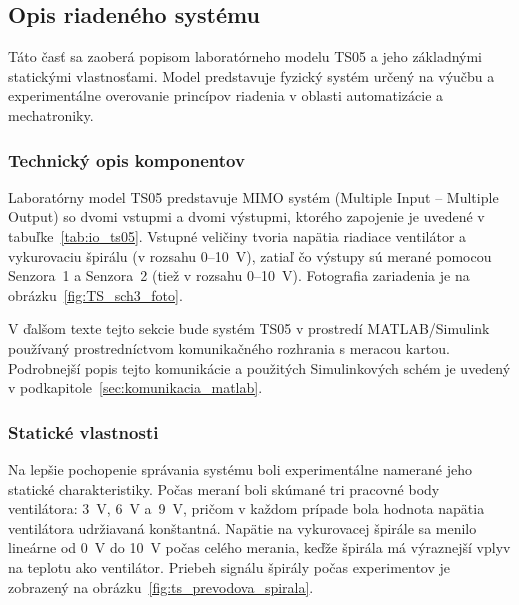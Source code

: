 \subsection{Opis riadeného systému}

Táto časť sa zaoberá popisom laboratórneho modelu TS05 a jeho základnými statickými vlastnosťami.  
Model predstavuje fyzický systém určený na výučbu a experimentálne overovanie princípov riadenia v oblasti automatizácie a mechatroniky.


\subsubsection{Technický opis komponentov}

Laboratórny model TS05 predstavuje MIMO systém (Multiple Input – Multiple Output) so dvomi vstupmi a dvomi výstupmi, ktorého zapojenie je uvedené v tabuľke~\ref{tab:io_ts05}.  
Vstupné veličiny tvoria napätia riadiace ventilátor a vykurovaciu špirálu (v rozsahu 0–10~V), zatiaľ čo výstupy sú merané pomocou Senzora~1 a Senzora~2 (tiež v rozsahu 0–10~V). Fotografia zariadenia je na obrázku~\ref{fig:TS_sch3_foto}.



V ďalšom texte tejto sekcie bude systém TS05 v prostredí
MATLAB/Simulink používaný prostredníctvom komunikačného rozhrania
s meracou kartou. Podrobnejší popis tejto komunikácie a použitých
Simulinkových schém je uvedený v podkapitole~\ref{sec:komunikacia_matlab}.


\subsubsection{Statické vlastnosti}
\label{sec:staticke_vlastnosti}

Na lepšie pochopenie správania systému boli experimentálne namerané jeho statické charakteristiky.  
Počas meraní boli skúmané tri pracovné body ventilátora:  3~V, 6~V a~9~V,  pričom v každom prípade bola hodnota napätia ventilátora udržiavaná konštantná.  
Napätie na vykurovacej špirále sa menilo lineárne od 0~V do 10~V počas celého merania, keďže špirála má výraznejší vplyv na teplotu ako ventilátor.  
Priebeh signálu špirály počas experimentov je zobrazený na obrázku~\ref{fig:ts_prevodova_spirala}.


